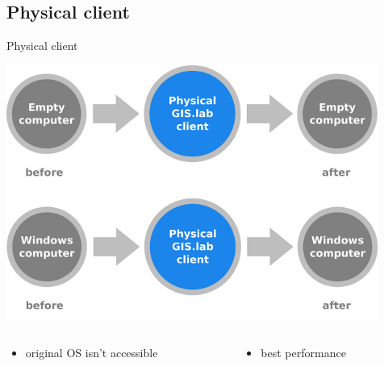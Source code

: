 \documentclass[12pt]{beamer}
\begin{document}
\subsection{Physical client}
\begin{frame}{Physical client}
	\begin{center}
		\includegraphics[keepaspectratio=true,height=0.5\textheight]{images/schema-physical-client.png}
	\end{center}
	\begin{columns}
		\begin{column}{0.5\textwidth}
			\begin{itemize}
				\item original OS isn't accessible 
			\end{itemize}				
    	\end{column}
		\begin{column}{0.5\textwidth}
			\begin{itemize}
				\item best performance
			\end{itemize}
		\end{column}
	\end{columns}	
\end{frame}
\end{document}
